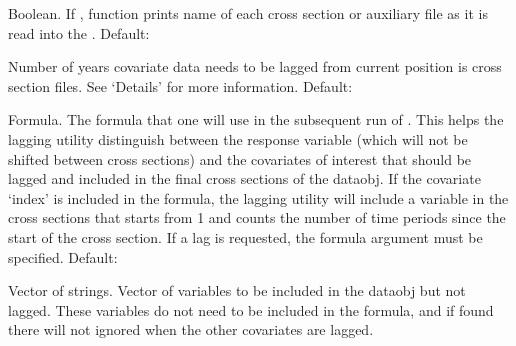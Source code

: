 \begin{Arguments}
\begin{ldescription}
\item[\code{verbose}] Boolean. If , function prints name of each
cross section or auxiliary file as it is read into the
. Default: 

\item[\code{lag}] Number of years covariate data needs to be lagged from
current position is cross section files. See `Details' for more
information. Default: 

\item[\code{formula}] Formula. The formula that one will use in the subsequent run of
. This helps the lagging utility distinguish between
the response variable (which will not be shifted between cross
sections) and the covariates of interest that should be lagged and
included in the final cross sections of the dataobj. If the covariate
`index' is included in the formula, the lagging utility will
include a variable in the cross sections that starts from 1 and counts
the number of time periods since the start of the cross section.
If a lag is requested, the formula argument must be specified.
Default: 

\item[\code{vars.nolag}] Vector of strings. Vector of variables to be included
in the dataobj but not lagged. These variables do not need to be
included in the formula, and if found there will not ignored when the
other covariates are lagged.


\end{ldescription}
\end{Arguments}
%
